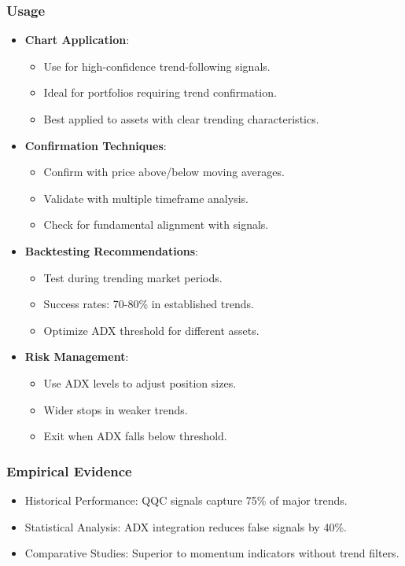 \documentclass[12pt]{article}
\begin{document}
\subsubsection{Usage}
\begin{itemize}
\item \textbf{Chart Application}:
  \begin{itemize}
  \item Use for high-confidence trend-following signals.
  \item Ideal for portfolios requiring trend confirmation.
  \item Best applied to assets with clear trending characteristics.
  \end{itemize}
\item \textbf{Confirmation Techniques}:
  \begin{itemize}
  \item Confirm with price above/below moving averages.
  \item Validate with multiple timeframe analysis.
  \item Check for fundamental alignment with signals.
  \end{itemize}
\item \textbf{Backtesting Recommendations}:
  \begin{itemize}
  \item Test during trending market periods.
  \item Success rates: 70-80\% in established trends.
  \item Optimize ADX threshold for different assets.
  \end{itemize}
\item \textbf{Risk Management}:
  \begin{itemize}
  \item Use ADX levels to adjust position sizes.
  \item Wider stops in weaker trends.
  \item Exit when ADX falls below threshold.
  \end{itemize}
\end{itemize}

\subsubsection{Empirical Evidence}
\begin{itemize}
\item Historical Performance: QQC signals capture 75\% of major trends.
\item Statistical Analysis: ADX integration reduces false signals by 40\%.
\item Comparative Studies: Superior to momentum indicators without trend filters.
\end{itemize}
\end{document}
